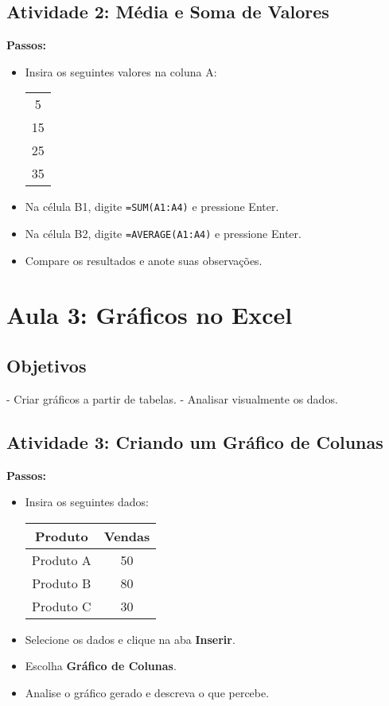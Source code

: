 \documentclass[12pt]{article}
\begin{document}
\subsection*{Atividade 2: Média e Soma de Valores}
\textbf{Passos:}
\begin{itemize}
    \item Insira os seguintes valores na coluna A:
    \begin{center}
        \begin{tabular}{|c|}
        \hline
        5 \\
        15 \\
        25 \\
        35 \\
        \hline
        \end{tabular}
    \end{center}
    \item Na célula B1, digite \texttt{=SUM(A1:A4)} e pressione Enter.
    \item Na célula B2, digite \texttt{=AVERAGE(A1:A4)} e pressione Enter.
    \item Compare os resultados e anote suas observações.
\end{itemize}

\section*{Aula 3: Gráficos no Excel}
\subsection*{Objetivos}
- Criar gráficos a partir de tabelas.
- Analisar visualmente os dados.

\subsection*{Atividade 3: Criando um Gráfico de Colunas}
\textbf{Passos:}
\begin{itemize}
    \item Insira os seguintes dados:
    \begin{center}
        \begin{tabular}{|c|c|}
        \hline
        Produto & Vendas \\
        \hline
        Produto A & 50 \\
        Produto B & 80 \\
        Produto C & 30 \\
        \hline
        \end{tabular}
    \end{center}
    \item Selecione os dados e clique na aba \textbf{Inserir}.
    \item Escolha \textbf{Gráfico de Colunas}.
    \item Analise o gráfico gerado e descreva o que percebe.
\end{itemize}
\end{document}
